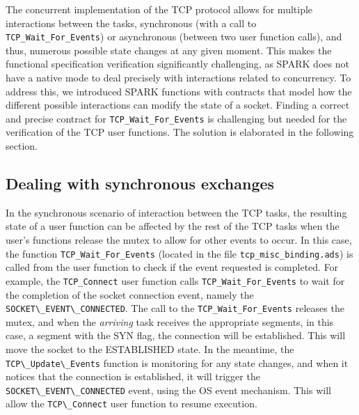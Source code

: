 \documentclass[conference]{IEEEtran}
\def\spark#1{\lstinline[language=Ada]{#1}}
\def\state#1{\textsf{\MakeUppercase{#1}}\xspace}
\def\sestab{\state{established}}
\def\flag#1{\textsf{#1}\xspace}
\def\syn{\flag{SYN}}
\begin{document}


%


The concurrent implementation of the TCP protocol allows for multiple interactions between the tasks, synchronous (with a call to \spark{TCP_Wait_For_Events}) or asynchronous (between two user function calls), and thus, numerous possible state changes at any given moment. This makes the functional specification verification significantly challenging, as SPARK does not have a native mode to deal precisely with interactions related to concurrency. To address this, we introduced SPARK functions with contracts that model how the different possible interactions can modify the state of a socket. Finding a correct and precise contract for \spark{TCP_Wait_For_Events} is challenging but needed for the verification of the TCP user functions. The solution is elaborated in the following section.


\subsection{Dealing with synchronous exchanges}


In the synchronous scenario of interaction between the TCP tasks, the resulting state of a user function can be affected by the rest of the TCP tasks when the user's functions release the mutex to allow for other events to occur. In this case, the function \spark{TCP_Wait_For_Events} (located in the file \texttt{tcp\_misc\_binding.ads}) is called from the user function to check if the event requested is completed. For example, the \spark{TCP_Connect} user function calls \spark{TCP_Wait_For_Events} to wait for the completion of the socket connection event, namely the \spark{SOCKET\_EVENT\_CONNECTED}. The call to the \spark{TCP_Wait_For_Events} releases the mutex, and when the \emph{arriving} task receives the appropriate segments, in this case, a segment with the \syn flag, the connection will be established. This will move the socket to the \sestab state. In the meantime, the \spark{TCP\_Update\_Events} function is monitoring for any state changes, and when it notices that the connection is established, it will trigger the \spark{SOCKET\_EVENT\_CONNECTED} event, using the OS event mechanism. This will allow the \spark{TCP\_Connect} user function to resume execution.
\end{document}
